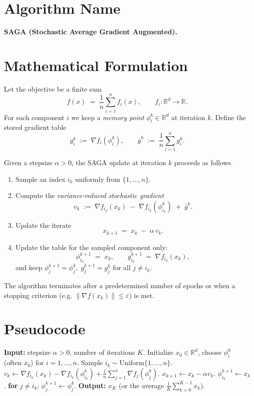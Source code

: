 \documentclass{article}
\newcommand{\R}{\mathbb{R}}
\newcommand{\norm}[1]{\left\|#1\right\|}
\newcommand{\grad}{\nabla}
\begin{document}
\section*{Algorithm Name}
\textbf{SAGA (Stochastic Average Gradient Augmented).}

\section*{Mathematical Formulation}
Let the objective be a finite sum
\[
f(x)\;=\;\frac1n\sum_{i=1}^{n} f_i(x),\qquad f_i:\R^d\to\R .
\]
For each component $i$ we keep a \emph{memory point} $\phi_i^k\in\R^d$ at iteration $k$.
Define the stored gradient table
\[
g_i^k \;:=\; \grad f_i(\phi_i^k),\qquad 
\bar g^k \;:=\;\frac1n\sum_{i=1}^{n} g_i^k .
\]

Given a stepsize $\alpha>0$, the SAGA update at iteration $k$ proceeds as follows.
\begin{enumerate}
\item Sample an index $i_k$ uniformly from $\{1,\dots,n\}$.
\item Compute the \emph{variance‑reduced stochastic gradient}
\[
v_k \;:=\; \grad f_{i_k}(x_k)\;-\;\grad f_{i_k}(\phi_{i_k}^k)\;+\;\bar g^k .
\]
\item Update the iterate
\[
x_{k+1}\;=\;x_k\;-\;\alpha\, v_k . \tag{1}
\]
\item Update the table for the sampled component only:
\[
\phi_{i_k}^{k+1}\;=\;x_k,\qquad 
g_{i_k}^{k+1}\;=\;\grad f_{i_k}(x_k),
\]
and keep $\phi_j^{k+1}=\phi_j^{k},\;g_j^{k+1}=g_j^{k}$ for all $j\neq i_k$.
\end{enumerate}
The algorithm terminates after a predetermined number of epochs or when a
stopping criterion (e.g. $\norm{\grad f(x_k)}\le\varepsilon$) is met.

\section*{Pseudocode}
\begin{algorithm}[H]
\caption{SAGA}
\begin{algorithmic}[1]
\STATE \textbf{Input:} stepsize $\alpha>0$, number of iterations $K$.
\STATE Initialize $x_0\in\R^d$, choose $\phi_i^0$ (often $x_0$) for $i=1,\dots,n$.
    \STATE Sample $i_k\sim\text{Uniform}\{1,\dots,n\}$.
    \STATE $v_k\gets \grad f_{i_k}(x_k)-\grad f_{i_k}(\phi_{i_k}^k)+\frac1n\sum_{j=1}^{n}\grad f_j(\phi_j^k)$.
    \STATE $x_{k+1}\gets x_k-\alpha v_k$.
    \STATE $\phi_{i_k}^{k+1}\gets x_k$.
    \STATE \textbf{for} $j\neq i_k$: $\phi_j^{k+1}\gets\phi_j^{k}$.
\ENDFOR
\STATE \textbf{Output:} $x_K$ (or the average $\frac1K\sum_{k=0}^{K-1}x_k$).
\end{algorithmic}
\end{algorithm}
\end{document}
